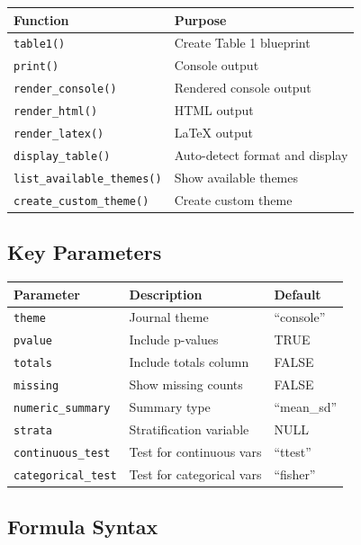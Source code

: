 \documentclass[
]{article}
\newcounter{none} %
\begin{document}
{\def\LTcaptype{none} %
\begin{longtable}[]{@{}ll@{}}
\toprule\noalign{}
Function & Purpose \\
\midrule\noalign{}
\endhead
\bottomrule\noalign{}
\endlastfoot
\texttt{table1()} & Create Table 1 blueprint \\
\texttt{print()} & Console output \\
\texttt{render\_console()} & Rendered console output \\
\texttt{render\_html()} & HTML output \\
\texttt{render\_latex()} & LaTeX output \\
\texttt{display\_table()} & Auto-detect format and display \\
\texttt{list\_available\_themes()} & Show available themes \\
\texttt{create\_custom\_theme()} & Create custom theme \\
\end{longtable}
}

\subsection{Key Parameters}\label{key-parameters}

{\def\LTcaptype{none} %
\begin{longtable}[]{@{}lll@{}}
\toprule\noalign{}
Parameter & Description & Default \\
\midrule\noalign{}
\endhead
\bottomrule\noalign{}
\endlastfoot
\texttt{theme} & Journal theme & ``console'' \\
\texttt{pvalue} & Include p-values & TRUE \\
\texttt{totals} & Include totals column & FALSE \\
\texttt{missing} & Show missing counts & FALSE \\
\texttt{numeric\_summary} & Summary type & ``mean\_sd'' \\
\texttt{strata} & Stratification variable & NULL \\
\texttt{continuous\_test} & Test for continuous vars & ``ttest'' \\
\texttt{categorical\_test} & Test for categorical vars & ``fisher'' \\
\end{longtable}
}

\subsection{Formula Syntax}\label{formula-syntax}
\end{document}

